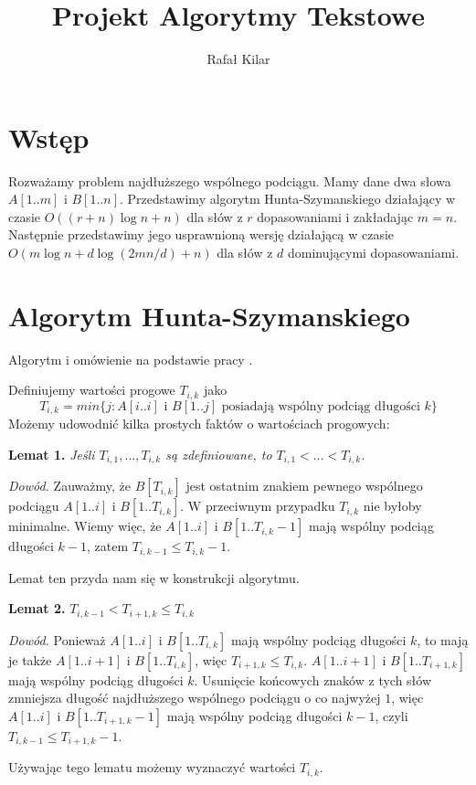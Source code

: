 \documentclass[11pt]{article}
\title{Projekt Algorytmy Tekstowe}
\author{Rafał Kilar}
\begin{document}
\maketitle

\section*{Wstęp}

Rozważamy problem najdłuższego wspólnego podciągu. Mamy dane dwa słowa $A[1..m]$ i $B[1..n]$. Przedstawimy algorytm Hunta-Szymanskiego działający w czasie $O((r+n) \log{n} + n)$ dla słów z $r$ dopasowaniami i zakładając $m = n$. Następnie przedstawimy jego usprawnioną wersję działającą w czasie $O(m\log{n} + d \log{(2mn/d)} + n)$ dla słów z $d$ dominującymi dopasowaniami.

\section*{Algorytm Hunta-Szymanskiego}

Algorytm i omówienie na podstawie pracy \cite{hunt1977fast}.

Definiujemy wartości progowe $T_{i,k}$ jako 
$$T_{i,k} =  min\{j\colon \text{$A[i..i]$ i $B[1..j]$ posiadają wspólny podciąg długości $k$}\}$$
Możemy udowodnić kilka prostych faktów o wartościach progowych:

\textbf{Lemat 1.} \textit{Jeśli $T_{i,1}, \dots, T_{i, k}$ są zdefiniowane, to $T_{i,1} < \dots < T_{i,k}$.}

\textit{Dowód.} Zauważmy, że $B[T_{i,k}]$ jest ostatnim znakiem pewnego wspólnego podciągu $A[1..i]$ i $B[1..T_{i,k}]$. W przeciwnym przypadku $T_{i,k}$ nie byłoby minimalne. Wiemy więc, że $A[1..i]$ i $B[1..T_{i,k}-1]$ mają wspólny podciąg długości $k-1$, zatem $T_{i,k-1} \le T_{i,k}-1$.

Lemat ten przyda nam się w konstrukcji algorytmu.

\textbf{Lemat 2.} $T_{i,k-1} < T_{i+1, k} \le T_{i,k}$

\textit{Dowód.} Ponieważ $A[1..i]$ i $B[1..T_{i,k}]$ mają wspólny podciąg długości $k$, to mają je także $A[1..i+1]$ i $B[1..T_{i,k}]$, więc $T_{i+1, k} \le T_{i,k}$. $A[1..i+1]$ i $B[1..T_{i+1,k}]$ mają wspólny podciąg długości $k$. Usunięcie końcowych znaków z tych słów zmniejsza długość najdłuższego wspólnego podciągu o co najwyżej $1$, więc $A[1..i]$ i $B[1..T_{i+1,k}-1]$ mają wspólny podciąg długości $k-1$, czyli $T_{i,k-1} \le T_{i+1,k} - 1$.

Używając tego lematu możemy wyznaczyć wartości $T_{i,k}$.
\end{document}
